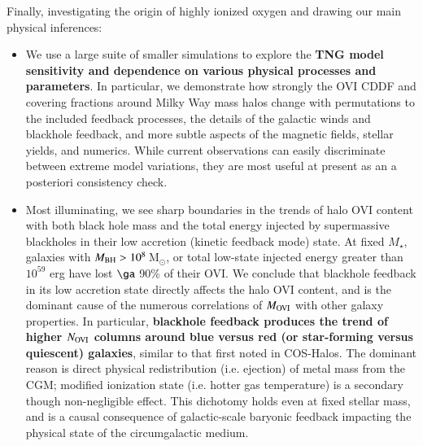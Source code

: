 \documentclass[useAMS,usenatbib]{mnras}
\newcommand{\msun}{\,M$_{\odot}$\xspace}
\newcommand{\ovi}{OVI\xspace}
\begin{document}
Finally, investigating the origin of highly ionized oxygen and drawing our main physical inferences:

\begin{itemize}
\item We use a large suite of smaller simulations to explore the \textbf{TNG model sensitivity and dependence on various physical processes and parameters}. In particular, we demonstrate how strongly the \ovi CDDF and covering fractions around Milky Way mass halos change with permutations to the included feedback processes, the details of the galactic winds and blackhole feedback, and more subtle aspects of the magnetic fields, stellar yields, and numerics. While current observations can easily discriminate between extreme model variations, they are most useful at present as an a posteriori consistency check.
\item Most illuminating, we see sharp boundaries in the trends of halo \ovi content with both black hole mass and the total energy injected by supermassive blackholes in their low accretion (kinetic feedback mode) state. At fixed $M_\star$, galaxies with $M_{\rm BH} > 10^{8}$\msun, or total low-state injected energy greater than $10^{59}$ erg have lost $\ga$ 90\% of their \ovi. We conclude that blackhole feedback in its low accretion state directly affects the halo \ovi content, and is the dominant cause of the numerous correlations of $M_{\rm OVI}$ with other galaxy properties. In particular, \textbf{blackhole feedback produces the trend of higher $N_{\rm OVI}$ columns around blue versus red (or star-forming versus quiescent) galaxies}, similar to that first noted in COS-Halos. The dominant reason is direct physical redistribution (i.e. ejection) of metal mass from the CGM; modified ionization state (i.e. hotter gas temperature) is a secondary though non-negligible effect. This dichotomy holds even at fixed stellar mass, and is a causal consequence of galactic-scale baryonic feedback impacting the physical state of the circumgalactic medium.
\end{itemize}

\end{document}
